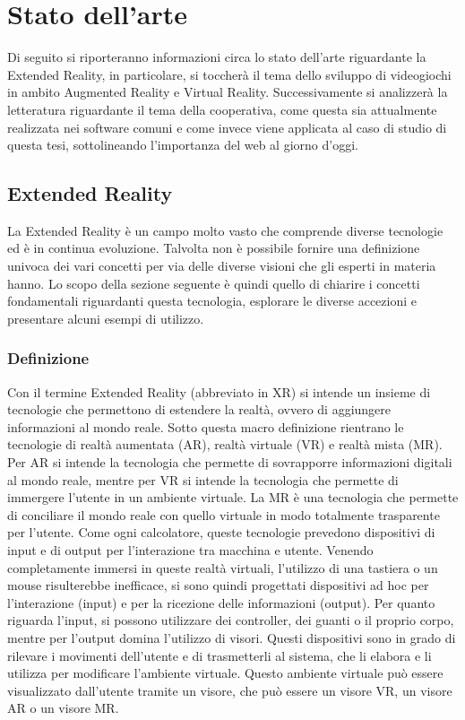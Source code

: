 \chapter{Stato dell'arte}\label{chap:Letteratura}
Di seguito si riporteranno informazioni circa lo stato dell'arte riguardante la Extended Reality, 
in particolare, si toccherà il tema dello sviluppo di videogiochi in ambito Augmented Reality e Virtual Reality. 
Successivamente si analizzerà la letteratura riguardante il tema della cooperativa, come questa sia attualmente 
realizzata nei software comuni e come invece viene applicata al caso di studio di questa tesi, 
sottolineando l'importanza del web al giorno d'oggi.

\section{Extended Reality}\label{sec:XR}
    La Extended Reality è un campo molto vasto che comprende diverse tecnologie ed è in continua 
    evoluzione. Talvolta non è possibile fornire una definizione univoca dei vari concetti per
    via delle diverse visioni che gli esperti in materia hanno.
    Lo scopo della sezione seguente è quindi quello di chiarire i concetti fondamentali riguardanti questa 
    tecnologia, esplorare le diverse accezioni e presentare alcuni esempi di utilizzo.
    \subsection{Definizione}\label{subsec:XRDef}
        Con il termine Extended Reality (abbreviato in XR) si intende un insieme di tecnologie che 
        permettono di estendere la realtà, ovvero di aggiungere informazioni al mondo reale. Sotto 
        questa macro definizione rientrano le tecnologie di realtà aumentata (AR), realtà virtuale
        (VR) e realtà mista (MR). Per AR si intende la tecnologia che permette di sovrapporre
        informazioni digitali al mondo reale, mentre per VR si intende la tecnologia che permette
        di immergere l'utente in un ambiente virtuale. La MR è una tecnologia che permette di
        conciliare il mondo reale con quello virtuale in modo totalmente trasparente per l'utente. Come ogni
        calcolatore, queste tecnologie prevedono dispositivi di input e di output per l'interazione
        tra macchina e utente. Venendo completamente immersi in queste realtà virtuali, l'utilizzo di una tastiera 
        o un mouse risulterebbe inefficace, si sono quindi progettati dispositivi ad hoc per l'interazione (input) e per
        la ricezione delle informazioni (output). Per quanto riguarda l'input, si possono utilizzare
        dei controller, dei guanti o il proprio corpo, mentre per l'output domina l'utilizzo di
        visori. Questi dispositivi sono in grado di rilevare i movimenti dell'utente e di trasmetterli 
        al sistema, che li elabora e li utilizza per modificare l'ambiente virtuale. Questo ambiente virtuale 
        può essere visualizzato dall'utente tramite un visore, che può essere un visore VR, un visore
        AR o un visore MR.
